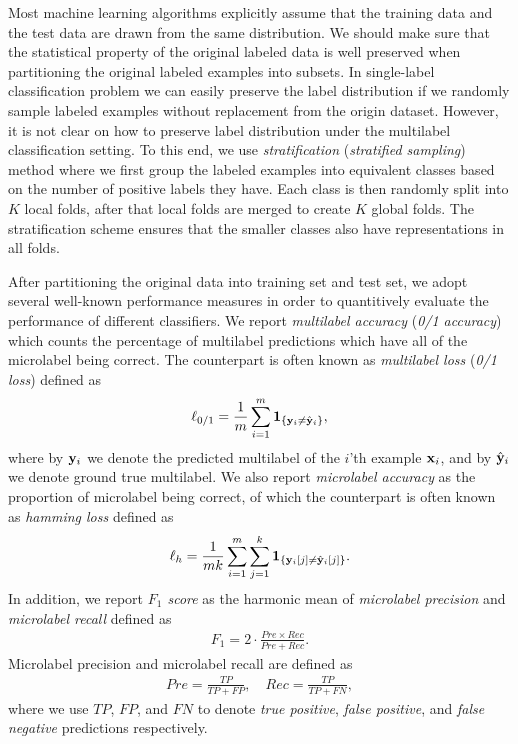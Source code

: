 {Most machine learning algorithms explicitly assume that the training data and the test data are drawn from the same distribution.
We should make sure that the statistical property of the original labeled data is well preserved when partitioning the original labeled examples into subsets.
In single-label classification problem we can easily preserve the label distribution if we randomly sample labeled examples without replacement from the origin dataset.
However, it is not clear on how to preserve label distribution under the multilabel classification setting.
To this end, we use \textit{stratification} (\textit{stratified sampling}) method where we first group the labeled examples into equivalent classes based on the number of positive labels they have. 
Each class is then randomly split into $K$ local folds, after that local folds are merged to create $K$ global folds.
The stratification scheme ensures that the smaller classes also have representations in all folds. 

After partitioning the original data into training set and test set, we adopt several well-known performance measures in order to quantitively evaluate the performance of different classifiers.
We report \textit{multilabel accuracy} (\textit{0/1 accuracy}) which counts the percentage of multilabel predictions which have all of the microlabel being correct.
The counterpart is often known as \textit{multilabel loss} (\textit{0/1 loss}) defined as
\begin{align*}
	\ell_{0/1} = \frac{1}{m}\sum_{i=1}^{m}\mathbf{1}_{\{\mathbf {y}_i \neq \hat{\mathbf {y}}_i\}},
\end{align*}
where by $\mathbf {y}_i$ we denote the predicted multilabel of the $i$'th example $\mathbf {x}_i$, and by $\hat{\mathbf {y}}_i$ we denote ground true multilabel.
We also report \textit{microlabel accuracy} as the proportion of microlabel being correct, of which the counterpart is often known as \textit{hamming loss} defined as
\begin{align*}
	\ell_{h} = \frac{1}{mk}\sum_{i=1}^{m}\sum_{j=1}^{k}\mathbf{1}_{\{\mathbf {y}_i[j] \neq \hat{\mathbf {y}}_i[j]\}}.
\end{align*}
In addition, we report \textit{$F_1$ score} as the harmonic mean of \textit{microlabel precision} and \textit{microlabel recall} defined as
\begin{align*}
	F_1 = 2\cdot\frac{Pre\times Rec}{Pre+Rec}.
\end{align*}
Microlabel precision and microlabel recall are defined as
\begin{align*}
	Pre = \frac{TP}{TP+FP}, \quad Rec = \frac{TP}{TP+FN},
\end{align*}
where we use $TP$, $FP$, and $FN$ to denote \textit{true positive}, \textit{false positive}, and \textit{false negative} predictions respectively.


}
